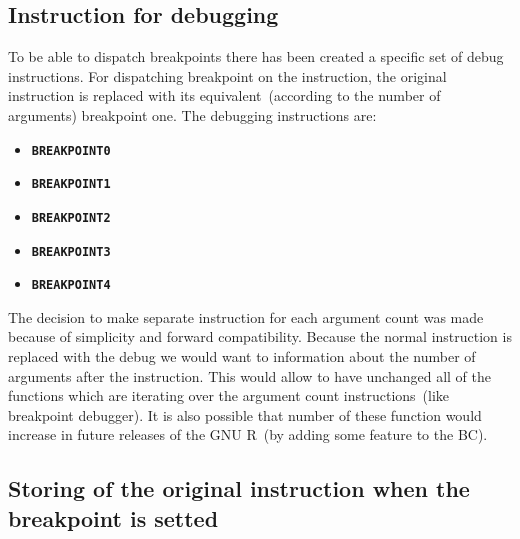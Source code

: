 \documentclass[thesis=M,english]{FITthesis}[2018/10/20]
\newcommand{\code}[1]{\texttt{#1}}
\begin{document}
\subsection{Instruction for debugging}\label{instruction-for-debugging}

To be able to dispatch breakpoints there has been created a specific set of debug instructions. For dispatching breakpoint on the instruction, the original instruction is replaced with its equivalent~(according to the number of arguments) breakpoint one. The debugging instructions are:

\begin{itemize}
	\item \textbf{\code{BREAKPOINT0}}
	\item \textbf{\code{BREAKPOINT1}}
	\item \textbf{\code{BREAKPOINT2}}
	\item \textbf{\code{BREAKPOINT3}}
	\item \textbf{\code{BREAKPOINT4}}
\end{itemize}

The decision to make separate instruction for each argument count was made because of simplicity and forward compatibility. Because the normal instruction is replaced with the debug we would want to information about the number of arguments after the instruction. This would allow to have unchanged all of the functions which are iterating over the argument count instructions~(like breakpoint debugger). It is also possible that number of these function would increase in future releases of the GNU R~(by adding some feature to the BC).


\subsection{Storing of the original instruction when the breakpoint is setted}\label{storing-original-instructions}
\end{document}
